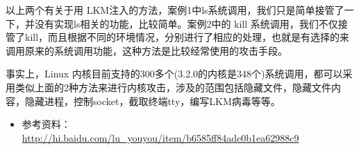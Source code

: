 以上两个有关于用
LKM注入的方法，案例1中ls系统调用，我们只是简单接管了一下，并没有实现ls相关的功能，比较简单。案例2中的
kill
系统调用，我们不仅接管了kill，而且根据不同的环境情况，分别进行了相应的处理，也就是有选择的来调用原来的系统调用功能，这种方法是比较经常使用的攻击手段。

事实上，Linux
内核目前支持的300多个(3.2.0的内核是348个)系统调用，都可以采用类似上面的2种方法来进行内核攻击，涉及的范围包括隐藏文件，隐藏文件内容，隐藏进程，控制socket，截取终端tty，编写LKM病毒等等。

\begin{itemize}
\item
  参考资料：\\\url{http://hi.baidu.com/lu_youyou/item/b6585ff84ade0b1ea62988c9}
\end{itemize}
